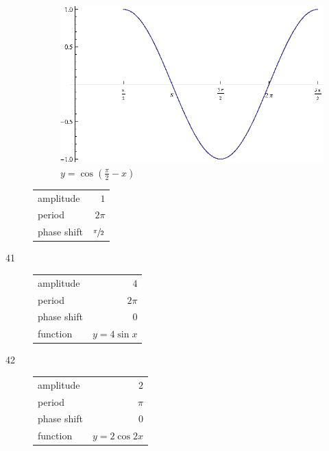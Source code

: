 \documentclass{exam}
\begin{document}
\begin{description}
        \begin{figure}[H]
          \centering
          \includegraphics[scale=1.0]{exercise40.eps}
          $y = \cos \left( \frac{\pi}{2} - x \right) $
        \end{figure}

        \begin{tabular}[H]{lr}
          \toprule
          amplitude   & $1$ \\
          period      & $2 \pi$ \\
          phase shift & $\sfrac{\pi}{2}$ \\
          \bottomrule
        \end{tabular}

    \item[41]
      \begin{tabular}[H]{lr}
        \toprule
        amplitude   & $4$ \\
        period      & $2 \pi$ \\
        phase shift & $0$ \\
        function    & $y = 4 \sin x$ \\
        \bottomrule
      \end{tabular}

    \item[42]
      \begin{tabular}[H]{lr}
        \toprule
        amplitude   & $2$ \\
        period      & $\pi$ \\
        phase shift & $0$ \\
        function    & $y = 2 \cos 2x$ \\
        \bottomrule
      \end{tabular}


\end{description}
\end{document}
